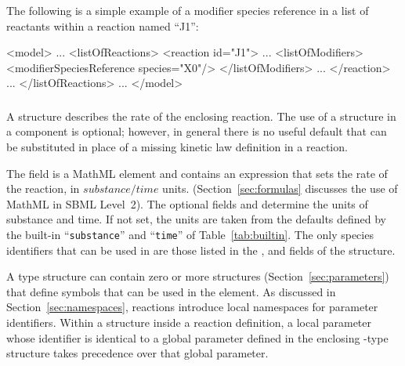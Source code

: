 \documentclass[10pt,twocolumntoc]{cekarticle}
\newcommand{\vref}[1]{\ref{#1}}
\begin{document}
The following is a simple example of a modifier species reference in a list
of reactants within a reaction named ``J1'':
\begin{example}
<model>
    ...
    <listOfReactions>
        <reaction id="J1">
            ...
            <listOfModifiers>
                <modifierSpeciesReference species="X0"/>
            </listOfModifiers>
            ...
        </reaction>
        ...
    </listOfReactions>
    ...
</model>
\end{example}

\subsubsection{}
\label{subsec:kinetic-law}

A  structure describes the rate of the enclosing
reaction.  The use of a  structure in a 
component is optional; however, in general there is no useful default that
can be substituted in place of a missing kinetic law definition in a
reaction.

The field  is a MathML element and contains an expression that
sets the rate of the reaction, in $substance/time$ units.
(Section~\ref{sec:formulas} discusses the use of MathML in SBML Level~2).
The optional fields  and 
determine the units of substance and time.  If not set, the units are taken
from the defaults defined by the built-in ``\texttt{substance}'' and
``\texttt{time}'' of Table~\vref{tab:builtin}.  The only species
identifiers that can be used in  are those listed in the
,  and  fields of the
 structure.

A  type structure can contain zero or more
 structures (Section~\ref{sec:parameters}) that
define symbols that can be used in the  element.  As
discussed in Section~\ref{sec:namespaces}, reactions introduce
local namespaces for parameter identifiers.  Within a
 structure inside a reaction definition, a local
parameter whose identifier is identical to a global parameter
defined in the enclosing -type structure takes
precedence over that global parameter.
\end{document}
